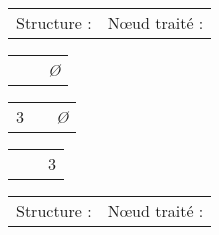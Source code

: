 \documentclass[11pt,a4paper]{article}
\begin{document}
\begin{center}

\begin{table}[ht!]
  \centering
  \begin{minipage}{0.45\textwidth}

\begin{tabular}{ L{4cm} L{2.5cm} }
Structure : & N\oe{}ud traité : \\
\end{tabular}

\smallskip

\begin{tabular}{ |C{0.5cm}| C{3cm} L{2cm} }
 & & \textit{Ø} \\
\end{tabular}

\medskip

\begin{tabular}{ |C{0.5cm}| C{3cm} L{2cm} }
3 & & \textit{Ø} \\
\end{tabular}

\medskip

\begin{tabular}{ |C{0.5cm}| C{3cm} L{2cm} }
 & & 3 \\
\end{tabular}

\vspace*{7.5cm}

  \end{minipage}
  \hfillx
  \begin{minipage}{0.01\textwidth}


  \end{minipage}
  \hfillx
  \begin{minipage}{0.45\textwidth}
    \centering

\begin{tabular}{ L{4cm} L{2.5cm} }
Structure : & N\oe{}ud traité : \\
\end{tabular}

\vspace*{9.65cm}

  \end{minipage}
\end{table}

\end{center}
\end{document}
